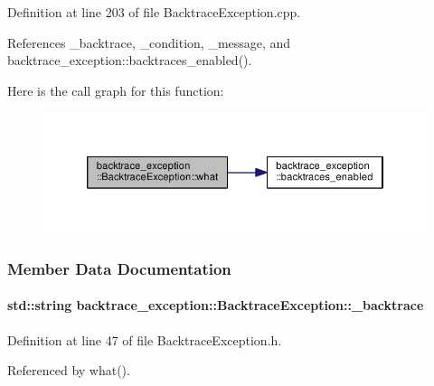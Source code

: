 Definition at line 203 of file Backtrace\+Exception.\+cpp.



References \+\_\+backtrace, \+\_\+condition, \+\_\+message, and backtrace\+\_\+exception\+::backtraces\+\_\+enabled().



Here is the call graph for this function\+:\nopagebreak
\begin{figure}[H]
\begin{center}
\leavevmode
\includegraphics[width=346pt]{classbacktrace__exception_1_1BacktraceException_a865bf08728344df9ed42bb5f6aef048f_cgraph}
\end{center}
\end{figure}




\subsubsection{Member Data Documentation}
\paragraph[{\texorpdfstring{\+\_\+backtrace}{_backtrace}}]{\setlength{\rightskip}{0pt plus 5cm}std\+::string backtrace\+\_\+exception\+::\+Backtrace\+Exception\+::\+\_\+backtrace\hspace{0.3cm}{\ttfamily [protected]}}\hypertarget{classbacktrace__exception_1_1BacktraceException_a86f9233184b7611b08faaf19b9490f43}{}\label{classbacktrace__exception_1_1BacktraceException_a86f9233184b7611b08faaf19b9490f43}


Definition at line 47 of file Backtrace\+Exception.\+h.



Referenced by what().

